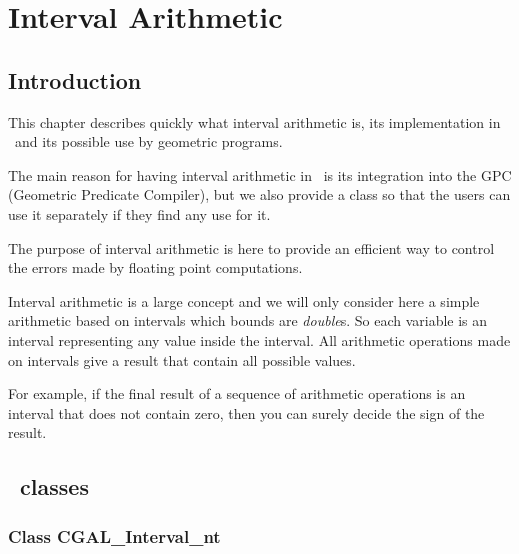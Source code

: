 \documentclass{book}
\begin{document}
\chapter{Interval Arithmetic}

\section{Introduction}

This chapter describes quickly what interval arithmetic is, its implementation
in \cgal\ and its possible use by geometric programs.

The main reason for having interval arithmetic in \cgal\ is its integration into
the GPC (Geometric Predicate Compiler), but we also provide a class so that the
users can use it separately if they find any use for it.

The purpose of interval arithmetic is here to provide an efficient way to
control the errors made by floating point computations.

Interval arithmetic is a large concept and we will only consider here a simple
arithmetic based on intervals which bounds are {\it double}s.
So each variable is an interval representing any value inside the interval.
All arithmetic operations made on intervals give a result that contain all
possible values.

\smallskip

For example, if the final result of a sequence of arithmetic operations is an
interval that does not contain zero, then you can surely decide the sign of the
result.

\section{\cgal\ classes}

\subsection {Class CGAL\_Interval\_nt}
\end{document}
